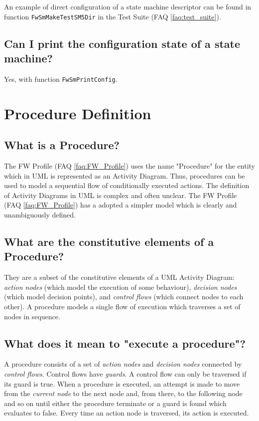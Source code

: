 \documentclass[a4paper,10pt]{article}
\let\stdsection\section
\renewcommand\section{\newpage\stdsection}
\begin{document}
An example of direct configuration of a state machine descriptor can be found in function \texttt{FwSmMakeTestSM5Dir} in the Test Suite (FAQ \ref{faq:test_suite}).

\subsection{Can I print the configuration state of a state machine?}
Yes, with function \texttt{FwSmPrintConfig}.

\section{Procedure Definition}

\subsection{What is a Procedure?}
The FW Profile (FAQ \ref{faq:FW_Profile}) uses the name "Procedure" for the entity which in UML is represented as an Activity Diagram. Thus, procedures can be used 
to model a sequential flow of conditionally executed actions. The definition of Activity Diagrams in UML is complex and often unclear. 
The FW Profile (FAQ \ref{faq:FW_Profile}) has a adopted a simpler model which is clearly and unambiguously defined.

\subsection{What are the constitutive elements of a Procedure?}
They are a subset of the constitutive elements of a UML Activity Diagram: \emph{action nodes} (which model the execution of some behaviour), 
\emph{decision nodes} (which model decision points), and \emph{control flows} (which connect nodes to each other). A procedure models a single flow of 
execution which traverses a set of nodes in sequence.

\subsection{What does it mean to "execute a procedure"?}\label{faq:PR_Execution}
A procedure consists of a set of \emph{action nodes} and \emph{decision nodes} connected by \emph{control flows}. Control flows have \emph{guards}. 
A control flow can only be traversed if its guard is true. When a procedure is executed, an attempt is made to move from the \emph{current node} 
to the next node and, from there, to the following node and so on until either the procedure terminate or a guard is found which evaluates to false. 
Every time an action node is traversed, its action is executed. 
\end{document}
